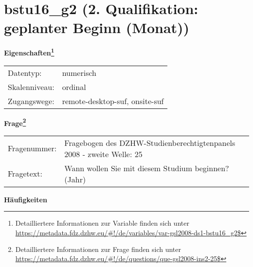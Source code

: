 
    \setcounter{footnote}{0}

    \vspace*{-1.8cm}
	\section{bstu16\_g2 (2. Qualifikation: geplanter Beginn (Monat))}
	\label{section:bstu16_g2}



    \vspace*{0.5cm}
    \noindent\textbf{Eigenschaften\footnote{Detailliertere Informationen zur Variable finden sich unter
		\url{https://metadata.fdz.dzhw.eu/\#!/de/variables/var-gsl2008-ds1-bstu16_g2$}}}\\
	\begin{tabularx}{\hsize}{@{}lX}
	Datentyp: & numerisch \\
	Skalenniveau: & ordinal \\
	Zugangswege: &
	  remote-desktop-suf, 
	  onsite-suf
 \\
    \end{tabularx}



				\vspace*{0.5cm}
                \noindent\textbf{Frage\footnote{Detailliertere Informationen zur Frage finden sich unter
		              \url{https://metadata.fdz.dzhw.eu/\#!/de/questions/que-gsl2008-ins2-25$}}}\\
				\begin{tabularx}{\hsize}{@{}lX}
					Fragenummer: &
					  Fragebogen des DZHW-Studienberechtigtenpanels 2008 - zweite Welle:
					  25
 \\
					Fragetext: & Wann wollen Sie mit diesem Studium beginnen? (Jahr) \\
				\end{tabularx}





        		\vspace*{0.5cm}
                \noindent\textbf{Häufigkeiten}

